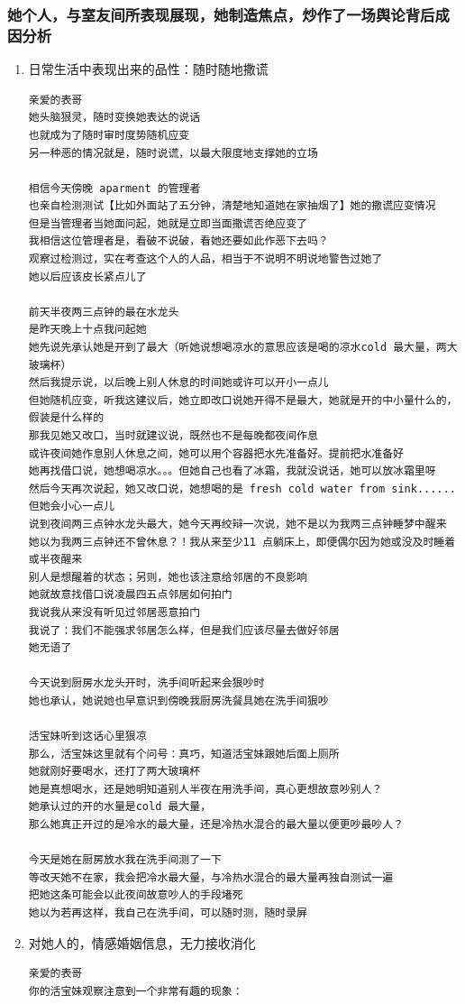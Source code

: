 \documentclass[9pt, b5paper]{article}
\begin{document}
\subsubsection{她个人，与室友间所表现展现，她制造焦点，炒作了一场舆论背后成因分析}
\label{sec-3-2-3}
\begin{enumerate}
\item 日常生活中表现出来的品性：随时随地撒谎
\label{sec-3-2-3-1}
\begin{verbatim}
亲爱的表哥
她头脑狠灵，随时变换她表达的说话
也就成为了随时审时度势随机应变
另一种恶的情况就是，随时说谎，以最大限度地支撑她的立场

相信今天傍晚 aparment 的管理者
也亲自检测测试【比如外面站了五分钟，清楚地知道她在家抽烟了】她的撒谎应变情况
但是当管理者当她面问起，她就是立即当面撒谎否绝应变了
我相信这位管理者是，看破不说破，看她还要如此作恶下去吗？
观察过检测过，实在考查这个人的人品，相当于不说明不明说地警告过她了
她以后应该皮长紧点儿了

前天半夜两三点钟的最在水龙头
是昨天晚上十点我问起她
她先说先承认她是开到了最大（听她说想喝凉水的意思应该是喝的凉水cold 最大量，两大玻璃杯）
然后我提示说，以后晚上别人休息的时间她或许可以开小一点儿
但她随机应变，听我这建议后，她立即改口说她开得不是最大，她就是开的中小量什么的，假装是什么样的
那我见她又改口，当时就建议说，既然也不是每晚都夜间作息
或许夜间她作息别人休息之间，她可以用个容器把水先准备好。提前把水准备好
她再找借口说，她想喝凉水。。。但她自己也看了冰霜，我就没说话，她可以放冰霜里呀
然后今天再次说起，她又改口说，她想喝的是 fresh cold water from sink......
但她会小心一点儿
说到夜间两三点钟水龙头最大，她今天再绞辩一次说，她不是以为我两三点钟睡梦中醒来
她以为我两三点钟还不曾休息？！我从来至少11 点躺床上，即便偶尔因为她或没及时睡着或半夜醒来
别人是想醒着的状态；另则，她也该注意给邻居的不良影响
她就故意找借口说凌晨四五点邻居如何拍门
我说我从来没有听见过邻居恶意拍门
我说了：我们不能强求邻居怎么样，但是我们应该尽量去做好邻居 
她无语了

今天说到厨房水龙头开时，洗手间听起来会狠吵时
她也承认，她说她也早意识到傍晚我厨房洗餐具她在洗手间狠吵

活宝妹听到这话心里狠凉 
那么，活宝妹这里就有个问号：真巧，知道活宝妹跟她后面上厕所
她就刚好要喝水，还打了两大玻璃杯
她是真想喝水，还是她明知道别人半夜在用洗手间，真心更想故意吵别人？
她承认过的开的水量是cold 最大量，
那么她真正开过的是冷水的最大量，还是冷热水混合的最大量以便更吵最吵人？

今天是她在厨房放水我在洗手间测了一下
等改天她不在家，我会把冷水最大量，与冷热水混合的最大量再独自测试一遍
把她这条可能会以此夜间故意吵人的手段堵死
她以为若再这样，我自己在洗手间，可以随时测，随时录屏
\end{verbatim}
\item 对她人的，情感婚姻信息，无力接收消化
\label{sec-3-2-3-2}
\begin{verbatim}
亲爱的表哥
你的活宝妹观察注意到一个非常有趣的现象：


\end{verbatim}
\end{enumerate}
\end{document}
